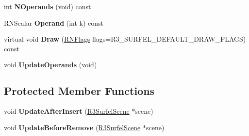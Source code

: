 \begin{DoxyCompactItemize}
\item 
int {\bfseries N\+Operands} (void) const \hypertarget{class_r3_surfel_object_property_aed0a30a2d783644252cef45ee404c45e}{}\label{class_r3_surfel_object_property_aed0a30a2d783644252cef45ee404c45e}

\item 
R\+N\+Scalar {\bfseries Operand} (int k) const \hypertarget{class_r3_surfel_object_property_a4056db9f92bae30c2a82efd26b776f1b}{}\label{class_r3_surfel_object_property_a4056db9f92bae30c2a82efd26b776f1b}

\item 
virtual void {\bfseries Draw} (\hyperlink{class_r_n_flags}{R\+N\+Flags} flags=R3\+\_\+\+S\+U\+R\+F\+E\+L\+\_\+\+D\+E\+F\+A\+U\+L\+T\+\_\+\+D\+R\+A\+W\+\_\+\+F\+L\+A\+GS) const \hypertarget{class_r3_surfel_object_property_a4a215d3e78f2d448b270ffa0844d7b58}{}\label{class_r3_surfel_object_property_a4a215d3e78f2d448b270ffa0844d7b58}

\item 
void {\bfseries Update\+Operands} (void)\hypertarget{class_r3_surfel_object_property_a125fe9018aed371aa54a6d896ad43152}{}\label{class_r3_surfel_object_property_a125fe9018aed371aa54a6d896ad43152}

\end{DoxyCompactItemize}
\subsection*{Protected Member Functions}
\begin{DoxyCompactItemize}
\item 
void {\bfseries Update\+After\+Insert} (\hyperlink{class_r3_surfel_scene}{R3\+Surfel\+Scene} $\ast$scene)\hypertarget{class_r3_surfel_object_property_aa37ae0d9993fedade0b58426c9f4cf30}{}\label{class_r3_surfel_object_property_aa37ae0d9993fedade0b58426c9f4cf30}

\item 
void {\bfseries Update\+Before\+Remove} (\hyperlink{class_r3_surfel_scene}{R3\+Surfel\+Scene} $\ast$scene)\hypertarget{class_r3_surfel_object_property_a7576113c3712ee82c16840d60f538f10}{}\label{class_r3_surfel_object_property_a7576113c3712ee82c16840d60f538f10}

\end{DoxyCompactItemize}
